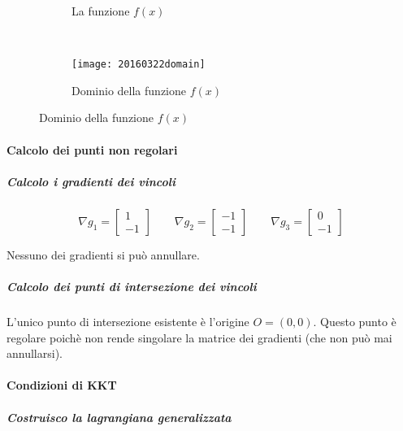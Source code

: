 \documentclass[\main/main.tex]{subfiles}
\begin{document}
\begin{figure}
  \begin{subfigure}{0.45\textwidth}
    \caption{La funzione $f(x)$}
    \label{func_2}
  \end{subfigure}
  ~
  \begin{subfigure}{0.45\textwidth}
    \texttt{[image: 20160322domain]}
    \caption{Dominio della funzione $f(x)$}
  \end{subfigure}
\end{figure}

\paragraph*{Calcolo dei punti non regolari}

\subparagraph*{Calcolo i gradienti dei vincoli}

\[
  \nabla g_1 = \begin{bmatrix}
    1 \\
    -1
  \end{bmatrix}
  \qquad
  \nabla g_2 = \begin{bmatrix}
    -1 \\
    -1
  \end{bmatrix}
  \qquad
  \nabla g_3 = \begin{bmatrix}
    0 \\
    -1
  \end{bmatrix}
\]

Nessuno dei gradienti si può annullare.

\subparagraph*{Calcolo dei punti di intersezione dei vincoli}
L'unico punto di intersezione esistente è l'origine $O=(0,0)$. Questo punto è regolare poichè non rende singolare la matrice dei gradienti (che non può mai annullarsi).

\paragraph*{Condizioni di KKT}

\subparagraph*{Costruisco la lagrangiana generalizzata}
\end{document}
